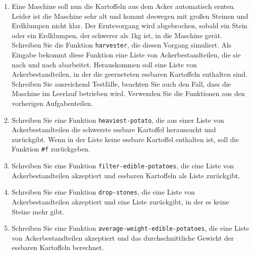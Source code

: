 \begin{aufgabe}
\begin{enumerate}
  \item Eine Maschine soll nun die Kartoffeln aus dem
    Acker automatisch ernten.  Leider ist die Maschine sehr alt und
    kommt deswegen mit großen Steinen und Erdklumpen nicht klar.  Der
    Erntevorgang wird abgebrochen, sobald ein Stein oder ein
    Erdklumpen, der schwerer als 1kg ist, in die Maschine gerät.
    Schreiben Sie die Funktion \texttt{harvester}, die diesen Vorgang
    simuliert. Als Eingabe bekommt diese Funktion eine Liste von
    Ackerbestandteilen, die sie nach und nach abarbeitet.
    Herauskommen soll eine Liste von Ackerbestandteilen, in der die
    geerneteten essbaren Kartoffeln enthalten sind.  Schreiben Sie
    ausreichend Testfälle, beachten Sie auch den Fall, dass die
    Maschine im Leerlauf betrieben wird.  Verwenden Sie die Funktionen
    aus den vorherigen Aufgabenteilen.

  \item Schreiben Sie eine Funktion
    \texttt{heaviest-potato}, die aus einer Liste von
    Ackerbestandteilen die schwerste essbare Kartoffel heraussucht und
    zurückgibt.  Wenn in der Liste keine essbare Kartoffel enthalten ist, soll
    die Funktion \verb|#f| zurückgeben.

    \item Schreiben Sie eine Funktion
      \texttt{filter-edible-potatoes}, die eine Liste von
      Ackerbestandteilen akzeptiert und essbaren Kartoffeln als Liste
      zurückgibt.

    \item Schreiben Sie eine Funktion
      \texttt{drop-stones}, die eine Liste von Ackerbestandteilen
      akzeptiert und eine Liste zurückgibt, in der es keine Steine mehr
      gibt.

    \item Schreiben Sie eine Funktion
      \texttt{average-weight-edible-potatoes}, die eine Liste von
      Ackerbestandteilen akzeptiert und das durchschnittliche Gewicht
      der essbaren Kartoffeln berechnet.

  \end{enumerate}
  
\end{aufgabe}

